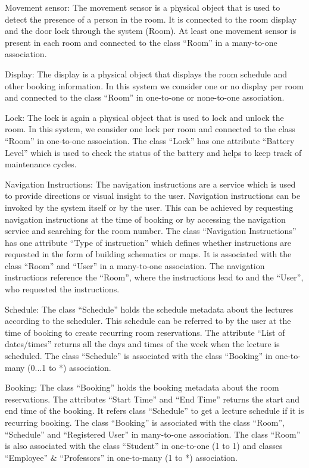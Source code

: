 \documentclass[article,onecolumn]{IEEEtran}
\begin{document}
		Movement sensor: The movement sensor is a physical object that is used to detect the presence of a person in the room. It is connected to the room display and the door lock through the system (Room). At least one movement sensor is present in each room and connected to the class ``Room'' in a many-to-one association.
		
		Display: The display is a physical object that displays the room schedule and other booking information. In this system we consider one or no display per room and connected to the class ``Room'' in one-to-one or none-to-one association.

		Lock: The lock is again a physical object that is used to lock and unlock the room. In this system, we consider one lock per room and connected to the class ``Room'' in one-to-one association. The class ``Lock'' has one attribute ``Battery Level'' which is used to check the status of the battery and helps to keep track of maintenance cycles.

		Navigation Instructions: The navigation instructions are a service which is used to provide directions or visual insight to the user. Navigation instructions can be invoked by the system itself or by the user. This can be achieved by requesting navigation instructions at the time of booking or by accessing the navigation service and searching for the room number. The class ``Navigation Instructions'' has one attribute ``Type of instruction'' which defines whether instructions are requested in the form of building schematics or maps. It is associated with the class ``Room'' and ``User'' in a many-to-one association. The navigation instructions reference the ``Room'', where the instructions lead to and the ``User'', who requested the instructions.

		Schedule: The class ``Schedule'' holds the schedule metadata about the lectures according to the scheduler. This schedule can be referred to by the user at the time of booking to create recurring room reservations. The attribute ``List of dates/times'' returns all the days and times of the week when the lecture is scheduled. The class ``Schedule'' is associated with the class ``Booking'' in one-to-many (0...1 to *) association.

		Booking: The class ``Booking'' holds the booking metadata about the room reservations. The attributes ``Start Time'' and ``End Time'' returns the start and end time of the booking. It refers class ``Schedule'' to get a lecture schedule if it is recurring booking. The class ``Booking'' is associated with the class ``Room'', ``Schedule'' and ``Registered User'' in many-to-one association. The class ``Room'' is also associated with the class ``Student'' in one-to-one (1 to 1) and classes ``Employee'' \& ``Professors'' in one-to-many (1 to *) association.
\end{document}
